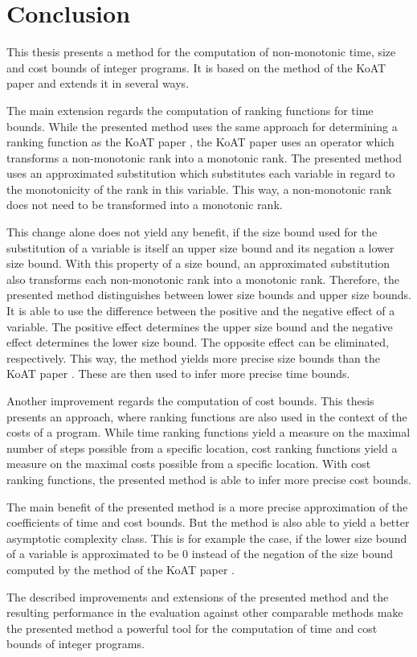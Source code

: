 \section{Conclusion}

This thesis presents a method for the computation of non-monotonic time, size and cost bounds of integer programs.
It is based on the method of the KoAT paper \cite{koat} and extends it in several ways.

The main extension regards the computation of ranking functions for time bounds.
While the presented method uses the same approach for determining a ranking function as the KoAT paper \cite{koat}, the KoAT paper uses an operator which transforms a non-monotonic rank into a monotonic rank.
The presented method uses an approximated substitution which substitutes each variable in regard to the monotonicity of the rank in this variable.
This way, a non-monotonic rank does not need to be transformed into a monotonic rank.

This change alone does not yield any benefit, if the size bound used for the substitution of a variable is itself an upper size bound and its negation a lower size bound.
With this property of a size bound, an approximated substitution also transforms each non-monotonic rank into a monotonic rank.
Therefore, the presented method distinguishes between lower size bounds and upper size bounds.
It is able to use the difference between the positive and the negative effect of a variable.
The positive effect determines the upper size bound and the negative effect determines the lower size bound.
The opposite effect can be eliminated, respectively.
This way, the method yields more precise size bounds than the KoAT paper \cite{koat}.
These are then used to infer more precise time bounds.

Another improvement regards the computation of cost bounds.
This thesis presents an approach, where ranking functions are also used in the context of the costs of a program.
While time ranking functions yield a measure on the maximal number of steps possible from a specific location, cost ranking functions yield a measure on the maximal costs possible from a specific location.
With cost ranking functions, the presented method is able to infer more precise cost bounds.

The main benefit of the presented method is a more precise approximation of the coefficients of time and cost bounds.
But the method is also able to yield a better asymptotic complexity class.
This is for example the case, if the lower size bound of a variable is approximated to be $0$ instead of the negation of the size bound computed by the method of the KoAT paper \cite{koat}.

The described improvements and extensions of the presented method and the resulting performance in the evaluation against other comparable methods make the presented method a powerful tool for the computation of time and cost bounds of integer programs.

